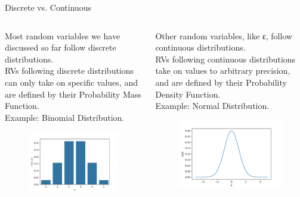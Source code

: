 \documentclass[aspectratio=169]{../latex_main/tntbeamer}  %
\begin{document}
	
	\begin{frame}{Discrete vs. Continuous}
	    \begin{columns}
	        \begin{column}{.4\textwidth}
	               Most random variables we have discussed so far follow discrete distributions.\\

	               RVs following discrete distributions can only take on specific values, and are defined by their Probability Mass Function.\\

	               Example: Binomial Distribution.
                    \begin{figure}
                        \includegraphics[scale=.5]{Bild4}
                    \end{figure}
	        \end{column}
	        
	        
	        \begin{column}{.4\textwidth}
	            Other random variables, like ε, follow continuous distributions.\\

	               RVs following continuous distributions take on values to arbitrary precision, and are defined by their Probability Density Function.\\
	               Example: Normal Distribution.\\
	               \bigskip
                    \begin{figure}
                        \includegraphics[scale=.5]{Bild5}
                    \end{figure}
	        \end{column}
	    \end{columns}
	\end{frame}
\end{document}
